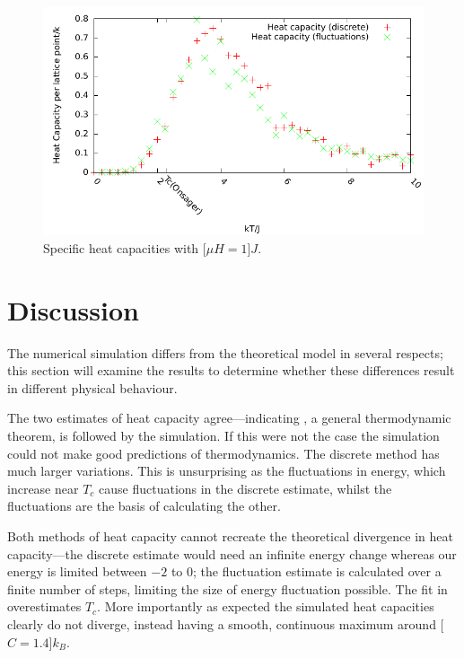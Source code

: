 \documentclass[12pt,a4paper,english]{article}
\begin{document}
\begin{figure}
\center
\includegraphics[width=\textwidth]{Optimized/tests/mag1-h.pdf}
\caption{Specific heat capacities with \unit[$\mu H = 1$]{$J$}.}\label{fig:magnetic-heat}
\end{figure}

\section{Discussion}
\label{sec:discussion}

The numerical simulation differs from the theoretical model in several respects; this section will examine the results to determine whether these differences result in different physical behaviour.

The two estimates of heat capacity agree---indicating , a general thermodynamic theorem, is followed by the simulation. If this were not the case the simulation could not make good predictions of thermodynamics. The discrete method has much larger variations.  This is unsurprising as the fluctuations in energy, which increase near $T_c$ cause fluctuations in the discrete estimate, whilst the fluctuations are the basis of calculating the other.

Both methods of heat capacity cannot recreate the theoretical divergence in heat capacity---the discrete estimate would need an infinite energy change whereas our energy is limited between $-2$ to $0$; the fluctuation estimate is calculated over a finite number of steps, limiting the size of energy fluctuation possible.  The fit in  overestimates $T_c$.  More importantly as expected the simulated heat capacities clearly do not diverge, instead having a smooth, continuous maximum around \unit[$C=1.4$]{$k_B$}.
\end{document}
